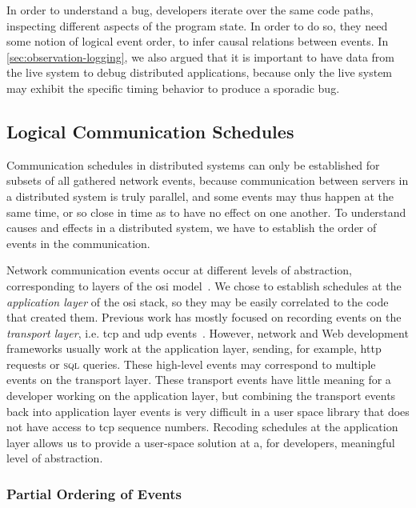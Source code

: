 In order to understand a bug, developers iterate over the same code
paths, inspecting different aspects of the program state. In order to
do so, they need some notion of logical event order, to infer causal
relations between events. In \autoref{sec:observation-logging}, we
also argued that it is important to have data from the live system to
debug distributed applications, because only the live system may
exhibit the specific timing behavior to produce a sporadic bug.

\subsection{Logical Communication Schedules}
\label{sec:logical-schedules}

Communication schedules in distributed systems can only be established
for subsets of all gathered network events, because communication
between servers in a distributed system is truly parallel, and some
events may thus happen at the same time, or so close in time as to
have no effect on one another. To understand causes and effects in a
distributed system, we have to establish the order of events in the
communication.

Network communication events occur at different levels of abstraction,
corresponding to layers of the \ac{osi}
model~\cite{zimmermann1980osi}. We chose to establish schedules at the
\emph{application layer} of the \ac{osi} stack, so they may be easily
correlated to the code that created them.  Previous work has mostly
focused on recording events on the \emph{transport layer},
i.e. \ac{tcp} and \ac{udp}
events~\cite{Geels2006Replay,Konuru2000}. However, network and Web
development frameworks usually work at the application layer, sending,
for example, \ac{http} requests or \textsc{sql} queries. These
high-level events may correspond to multiple events on the transport
layer. These transport events have little meaning for a developer
working on the application layer, but combining the transport events
back into application layer events is very difficult in a user space
library that does not have access to \eg \ac{tcp} sequence
numbers. Recoding schedules at the application layer allows us to
provide a user-space solution at a, for developers, meaningful level
of abstraction.

\subsubsection{Partial Ordering of Events}
\label{sec:lamport-clocks-1}

